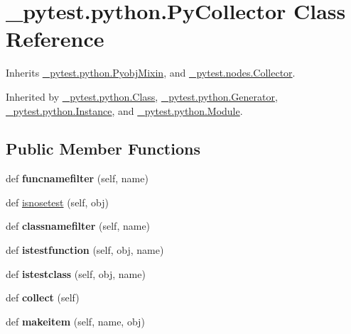 \hypertarget{class__pytest_1_1python_1_1_py_collector}{}\section{\+\_\+pytest.\+python.\+Py\+Collector Class Reference}
\label{class__pytest_1_1python_1_1_py_collector}


Inherits \hyperlink{class__pytest_1_1python_1_1_pyobj_mixin}{\+\_\+pytest.\+python.\+Pyobj\+Mixin}, and \hyperlink{class__pytest_1_1nodes_1_1_collector}{\+\_\+pytest.\+nodes.\+Collector}.



Inherited by \hyperlink{class__pytest_1_1python_1_1_class}{\+\_\+pytest.\+python.\+Class}, \hyperlink{class__pytest_1_1python_1_1_generator}{\+\_\+pytest.\+python.\+Generator}, \hyperlink{class__pytest_1_1python_1_1_instance}{\+\_\+pytest.\+python.\+Instance}, and \hyperlink{class__pytest_1_1python_1_1_module}{\+\_\+pytest.\+python.\+Module}.

\subsection*{Public Member Functions}
\begin{DoxyCompactItemize}
\item 
\mbox{\label{class__pytest_1_1python_1_1_py_collector_a9b0846d05a071faffe512bb1598e2599}} 
def {\bfseries funcnamefilter} (self, name)
\item 
def \hyperlink{class__pytest_1_1python_1_1_py_collector_ab2fa5c912b2fcf458c154d9af939096b}{isnosetest} (self, obj)
\item 
\mbox{\label{class__pytest_1_1python_1_1_py_collector_a0ef52ee35806959d90ef3018c5f7a874}} 
def {\bfseries classnamefilter} (self, name)
\item 
\mbox{\label{class__pytest_1_1python_1_1_py_collector_a1cbcbe7c0647d29a1440578c3c8b137e}} 
def {\bfseries istestfunction} (self, obj, name)
\item 
\mbox{\label{class__pytest_1_1python_1_1_py_collector_aa4587af8d820e3520f460bbd4a067d05}} 
def {\bfseries istestclass} (self, obj, name)
\item 
\mbox{\label{class__pytest_1_1python_1_1_py_collector_ab371ebcc42e52ed1bf009d08e0734747}} 
def {\bfseries collect} (self)
\item 
\mbox{\label{class__pytest_1_1python_1_1_py_collector_a0144e0695b61b843d981391f8ce4d353}} 
def {\bfseries makeitem} (self, name, obj)
\end{DoxyCompactItemize}
